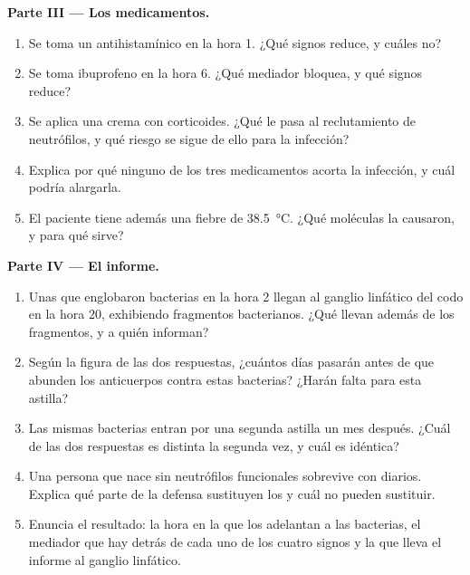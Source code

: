 \begin{problem}
\medskip
\noindent\textbf{Parte III --- Los medicamentos.}
\begin{enumerate}[resume]
  \item Se toma un antihistamínico en la hora 1. ¿Qué signos reduce, y
        cuáles no?
  \item Se toma ibuprofeno en la hora 6. ¿Qué mediador bloquea, y qué
        signos reduce?
  \item Se aplica una crema con corticoides. ¿Qué le pasa al
        reclutamiento de neutrófilos, y qué riesgo se sigue de ello
        para la infección?
  \item Explica por qué ninguno de los tres medicamentos acorta la
        infección, y cuál podría alargarla.
  \item El paciente tiene además una fiebre de \qty{38.5}{\celsius}.
        ¿Qué moléculas la causaron, y para qué sirve?
\end{enumerate}

\medskip
\noindent\textbf{Parte IV --- El informe.}
\begin{enumerate}[resume]
  \item Unas  que englobaron bacterias en la hora 2
        llegan al ganglio linfático del codo en la hora 20, exhibiendo
        fragmentos bacterianos. ¿Qué llevan además de los fragmentos, y
        a quién informan?
  \item Según la figura de las dos respuestas, ¿cuántos días pasarán
        antes de que abunden los anticuerpos contra estas bacterias?
        ¿Harán falta para esta astilla?
  \item Las mismas bacterias entran por una segunda astilla un mes
        después. ¿Cuál de las dos respuestas es distinta la segunda
        vez, y cuál es idéntica?
  \item Una persona que nace sin neutrófilos funcionales sobrevive con
         diarios. Explica qué parte de la defensa
        sustituyen los  y cuál no pueden sustituir.
  \item Enuncia el resultado: la hora en la que los  adelantan
        a las bacterias, el mediador que hay detrás de cada uno de los
        cuatro signos y la  que lleva el informe al ganglio
        linfático.
\end{enumerate}
\end{problem}
